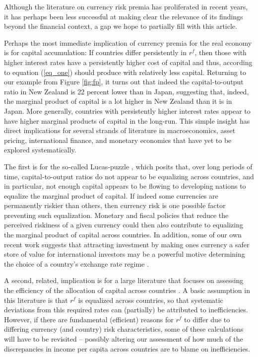 \documentclass{ar-1col}
\begin{document}
Although the literature on currency risk premia has proliferated in recent years, it has perhaps been less successful at making clear the relevance of its findings beyond the financial context, a gap we hope to partially fill with this article.

Perhaps the most immediate implication of currency premia for the real economy is for capital accumulation: If countries differ persistently in $r^f$, then those with higher interest rates have a persistently higher cost of capital and thus, according to equation (\ref{eq_one}) should produce with relatively less capital. Returning to our example from Figure \ref{fig:fp}, it turns out that indeed the capital-to-output ratio in New Zealand is 22 percent lower than in Japan, suggesting that, indeed, the marginal product of capital is a lot higher in New Zealand than it is in Japan. More generally, countries with persistently higher interest rates appear to have higher marginal products of capital in the long-run. This simple insight has direct implications for several strands of literature in macroeconomics, asset pricing, international finance, and monetary economics that have yet to be explored systematically.

The first is for the so-called Lucas-puzzle \citep{Lucas1990}, which posits that, over long periods of time, capital-to-output ratios do not appear to be equalizing across countries, and in particular, not enough capital appears to be flowing to developing nations to equalize the marginal product of capital. If indeed some currencies are permanently riskier than others, then currency risk is one possible factor preventing such equalization. Monetary and fiscal policies that reduce the perceived riskiness of a given currency could then also contribute to equalizing the marginal product of capital across countries. In addition, some of our own recent work suggests that attracting investment by making ones currency a safer store of value for international investors may be a powerful motive determining the choice of a country's exchange rate regime \citep{hassan2016currency}.

A second, related, implication is for a large literature that focuses on assessing the efficiency of the allocation of capital across countries \citep{HallJones1997, CaselliFeyrer2007}. A basic assumption in this literature is that $r^f$ is equalized across countries, so that systematic deviations from this required rates can (partially) be attributed to inefficiencies. However, if there are fundamental (efficient) reasons for $r^f$ to differ due to differing currency (and country) risk characteristics, some of these calculations will have to be revisited -- possibly altering our assessment of how much of the discrepancies in income per capita across countries are to blame on inefficiencies.
\end{document}
